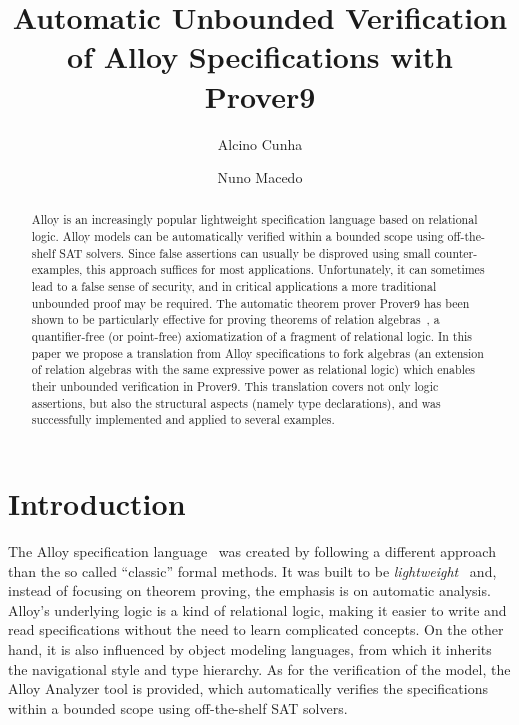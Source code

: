\documentclass{llncs}
\title{Automatic Unbounded Verification of Alloy Specifications with Prover9}
\author{Alcino Cunha \and Nuno Macedo}
\institute{{HASLab} --- High Assurance Software Laboratory\\ INESC TEC \& Universidade do Minho, Braga, Portugal\\ \vspace{0.3cm} May 2011}
\begin{document}
\maketitle

\begin{abstract}
  Alloy is an increasingly popular lightweight specification language
  based on relational logic. Alloy models can be automatically
  verified within a bounded scope using off-the-shelf SAT
  solvers. Since false assertions can usually be disproved using small
  counter-examples, this approach suffices for most
  applications. Unfortunately, it can sometimes lead to a false sense
  of security, and in critical applications a more traditional
  unbounded proof may be required. The automatic theorem prover
  Prover9 has been shown to be particularly effective for proving
  theorems of relation algebras~\cite{crp9}, a quantifier-free (or
  point-free) axiomatization of a fragment of relational logic.  In this
  paper we propose a translation from Alloy specifications to fork
  algebras (an extension of relation algebras with the same expressive
  power as relational logic) which enables their unbounded
  verification in Prover9. This translation covers not only logic
  assertions, but also the structural aspects (namely type
  declarations), and was successfully implemented and applied to
  several examples.
\end{abstract}

\section{Introduction}

The Alloy specification language~\cite{alloyb} was created by
following a different approach than the so called ``classic'' formal
methods. It was built to be \emph{lightweight}~\cite{lightweight} and,
instead of focusing on theorem proving, the emphasis is on automatic
analysis. Alloy's underlying logic is a kind of relational logic,
making it easier to write and read specifications without the need to
learn complicated concepts. On the other hand, it is also influenced
by object modeling languages, from which it inherits the navigational
style and type hierarchy. As for the verification of the model, the
Alloy Analyzer tool is provided, which automatically verifies the
specifications within a bounded scope using off-the-shelf SAT solvers.
\end{document}

